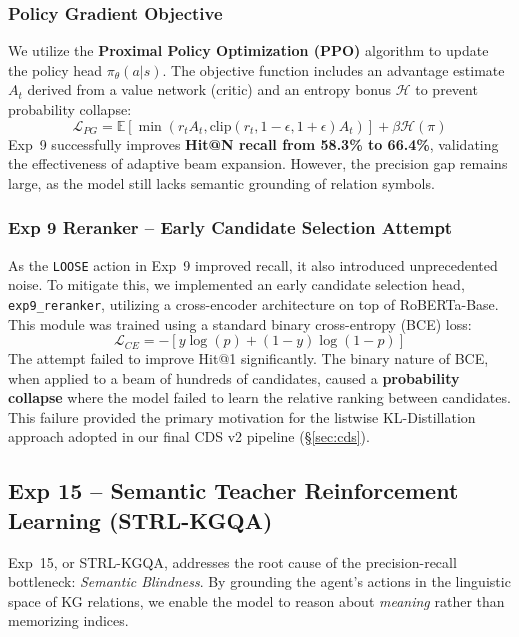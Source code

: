 \documentclass[11pt,a4paper]{article}
\makeatletter
\newcommand{\STRL}{\textsc{STRL-KGQA}}
\newcommand{\HitOne}{Hit@1}
\makeatother
\begin{document}
\subsubsection{Policy Gradient Objective}
We utilize the \textbf{Proximal Policy Optimization (PPO)} algorithm to
update the policy head $\pi_\theta(a|s)$. The objective function includes
an advantage estimate $A_t$ derived from a value network (critic) and an
entropy bonus $\mathcal{H}$ to prevent probability collapse:
\begin{equation}
    \mathcal{L}_{PG} = \mathbb{E} [ \min(r_t A_t, \text{clip}(r_t, 1-\epsilon, 1+\epsilon) A_t) ] + \beta \mathcal{H}(\pi)
\end{equation}
Exp~9 successfully improves \textbf{Hit@N recall from 58.3\% to 66.4\%},
validating the effectiveness of adaptive beam expansion. However, the
precision gap remains large, as the model still lacks semantic grounding of
relation symbols.

\subsubsection{Exp 9 Reranker -- Early Candidate Selection Attempt}
As the \texttt{LOOSE} action in Exp~9 improved recall, it also introduced
unprecedented noise. To mitigate this, we implemented an early candidate
selection head, \texttt{exp9\_reranker}, utilizing a cross-encoder
architecture on top of RoBERTa-Base. 
This module was trained using a standard binary cross-entropy (BCE) loss:
\begin{equation}
    \mathcal{L}_{CE} = -[y \log(p) + (1-y) \log(1-p)]
\end{equation}
The attempt failed to improve \HitOne{} significantly. The binary nature of
BCE, when applied to a beam of hundreds of candidates, caused a
\textbf{probability collapse} where the model failed to learn the relative
ranking between candidates. This failure provided the primary motivation
for the listwise KL-Distillation approach adopted in our final CDS v2
pipeline (§\ref{sec:cds}).

\subsection{Exp 15 -- Semantic Teacher Reinforcement Learning (\STRL{})}
\label{sec:exp15}

Exp~15, or \STRL{}, addresses the root cause of the precision-recall
bottleneck: \emph{Semantic Blindness}. By grounding the agent's actions in
the linguistic space of KG relations, we enable the model to reason about
\emph{meaning} rather than memorizing indices.
\end{document}
